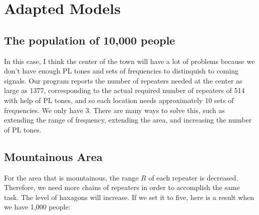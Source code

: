 \documentclass{icmmcm}
\begin{document}
\section{Adapted Models}
\subsection{The population of 10,000 people}
In this case, I think the center of the town will have a lot of problems because we don't have enough PL tones and sets of frequencies to distinquish to coming signals. Our program reports the number of repeaters needed at the center as large as 1377, corresponding to the actual required number of repeaters of 514 with help of PL tones, and so each location needs approximately 10 sets of frequencies. We only have 3. There are many ways to solve this, such as extending the range of frequency, extending the area, and increasing the number of PL tones.

\subsection{Mountainous Area}
For the area that is mountainous, the range $R$ of each repeater is decreased. Therefore, we need more chains of repeaters in order to accomplish the same task. The level of haxagons will increase. If we set it to five, here is a result when we have 1,000 people:
\end{document}
